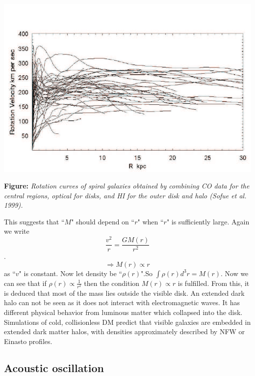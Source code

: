 \documentclass[12pt]{report}
\begin{document}
\begin{center}

\includegraphics[scale=0.5]{rcurve.png}


\textbf{Figure:} \textit{ Rotation curves of spiral galaxies obtained by combining CO data for
the central regions, optical for disks, and HI for the outer disk and halo (Sofue et
al. 1999).} \cite{rcurve}
\end{center}

This suggests that ``$M$" should depend on ``$r$" when ``$r$" is sufficiently large\cite{rcurve}. Again we write $$\frac{v^2}{r}=\frac{GM(r)}{r^2}$$. $$\Rightarrow M(r)\propto r$$ as ``$v$" is constant. Now let density be ``$\rho(r)$".So $\int\rho(r)d^3r=M(r)$. Now we can see that if $\rho(r)\propto \frac{1}{r^2}$ then the condition $M(r)\propto r$ is fulfilled. From this, it is deduced that most of the mass lies outside the visible disk. An extended dark halo can not be seen as it does not interact with electromagnetic waves. It has different physical behavior from luminous matter which collapsed into the disk. Simulations of cold, collisionless DM predict that visible galaxies are embedded in extended dark matter halos, with densities approximately described by NFW or Einasto profiles.\\



\subsection{Acoustic oscillation}
 
  
  
\end{document}
